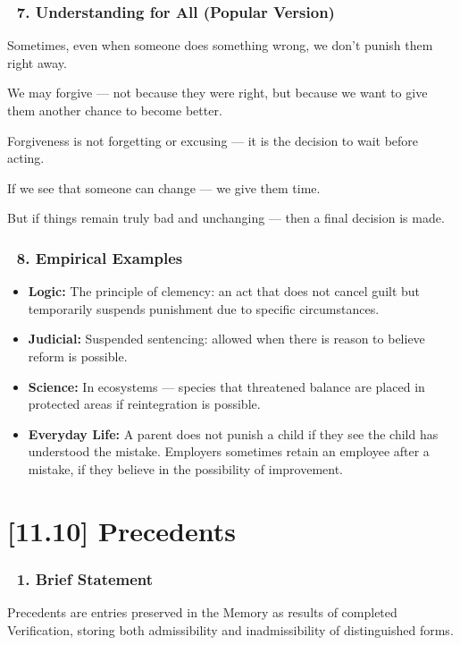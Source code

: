 \documentclass[12pt]{article}
\begin{document}
\subsubsection*{🔹 7. Understanding for All (Popular Version)}

Sometimes, even when someone does something wrong, we don’t punish them right away.

We may forgive — not because they were right, but because we want to give them another chance to become better.

Forgiveness is not forgetting or excusing — it is the decision to wait before acting.

If we see that someone can change — we give them time.

But if things remain truly bad and unchanging — then a final decision is made.

\subsubsection*{🔹 8. Empirical Examples}

\begin{itemize}
\item \textbf{Logic:} The principle of clemency: an act that does not cancel guilt but temporarily suspends punishment due to specific circumstances.
\item \textbf{Judicial:} Suspended sentencing: allowed when there is reason to believe reform is possible.
\item \textbf{Science:} In ecosystems — species that threatened balance are placed in protected areas if reintegration is possible.
\item \textbf{Everyday Life:} A parent does not punish a child if they see the child has understood the mistake. Employers sometimes retain an employee after a mistake, if they believe in the possibility of improvement.
\end{itemize}

\section*{[11.10] Precedents}

\subsubsection*{🔹 1. Brief Statement}

Precedents are entries preserved in the Memory as results of completed Verification, storing both admissibility and inadmissibility of distinguished forms.
\end{document}

